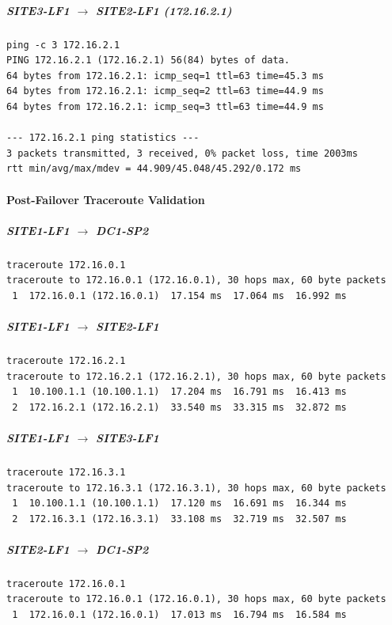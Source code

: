 \documentclass[11pt]{article}
\begin{document}
\subparagraph{SITE3-LF1 $\rightarrow$ SITE2-LF1 (172.16.2.1)}

\begin{verbatim}
ping -c 3 172.16.2.1
PING 172.16.2.1 (172.16.2.1) 56(84) bytes of data.
64 bytes from 172.16.2.1: icmp_seq=1 ttl=63 time=45.3 ms
64 bytes from 172.16.2.1: icmp_seq=2 ttl=63 time=44.9 ms
64 bytes from 172.16.2.1: icmp_seq=3 ttl=63 time=44.9 ms

--- 172.16.2.1 ping statistics ---
3 packets transmitted, 3 received, 0% packet loss, time 2003ms
rtt min/avg/max/mdev = 44.909/45.048/45.292/0.172 ms
\end{verbatim}

\paragraph{Post-Failover Traceroute Validation}

\subparagraph{SITE1-LF1 $\rightarrow$ DC1-SP2}

\begin{verbatim}
traceroute 172.16.0.1
traceroute to 172.16.0.1 (172.16.0.1), 30 hops max, 60 byte packets
 1  172.16.0.1 (172.16.0.1)  17.154 ms  17.064 ms  16.992 ms
\end{verbatim}

\subparagraph{SITE1-LF1 $\rightarrow$ SITE2-LF1}

\begin{verbatim}
traceroute 172.16.2.1
traceroute to 172.16.2.1 (172.16.2.1), 30 hops max, 60 byte packets
 1  10.100.1.1 (10.100.1.1)  17.204 ms  16.791 ms  16.413 ms
 2  172.16.2.1 (172.16.2.1)  33.540 ms  33.315 ms  32.872 ms
\end{verbatim}

\subparagraph{SITE1-LF1 $\rightarrow$ SITE3-LF1}

\begin{verbatim}
traceroute 172.16.3.1
traceroute to 172.16.3.1 (172.16.3.1), 30 hops max, 60 byte packets
 1  10.100.1.1 (10.100.1.1)  17.120 ms  16.691 ms  16.344 ms
 2  172.16.3.1 (172.16.3.1)  33.108 ms  32.719 ms  32.507 ms
\end{verbatim}

\subparagraph{SITE2-LF1 $\rightarrow$ DC1-SP2}

\begin{verbatim}
traceroute 172.16.0.1
traceroute to 172.16.0.1 (172.16.0.1), 30 hops max, 60 byte packets
 1  172.16.0.1 (172.16.0.1)  17.013 ms  16.794 ms  16.584 ms
\end{verbatim}
\end{document}
